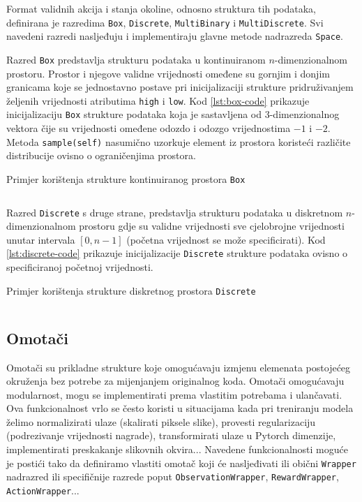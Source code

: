 Format validnih akcija i stanja okoline, odnosno struktura tih podataka, definirana je razredima \texttt{Box}, \texttt{Discrete}, \texttt{MultiBinary} i \texttt{MultiDiscrete}. Svi navedeni razredi nasljeđuju i implementiraju glavne metode nadrazreda \texttt{Space}. 

Razred \texttt{Box} predstavlja strukturu podataka u kontinuiranom $n$-dimenzionalnom prostoru. Prostor i njegove validne vrijednosti omeđene su gornjim i donjim granicama koje se jednostavno postave pri inicijalizaciji strukture pridruživanjem željenih vrijednosti atributima \texttt{high} i \texttt{low}. Kod \ref{lst:box-code} prikazuje inicijalizaciju \texttt{Box} strukture podataka koja je sastavljena od $3$-dimenzionalnog vektora čije su vrijednosti omeđene odozdo i odozgo vrijednostima $-1$ i $-2$. Metoda \texttt{sample(self)} nasumično uzorkuje element iz prostora koristeći različite distribucije ovisno o ograničenjima prostora.

\begin{listing}[H]
    \caption{Primjer korištenja strukture kontinuiranog prostora \texttt{Box}}
    \inputminted{python}{snippets/box.txt}
    \label{lst:box-code}
\end{listing}

Razred \texttt{Discrete} s druge strane, predstavlja strukturu podataka u diskretnom $n$-dimenzionalnom prostoru gdje su validne vrijednosti sve cjelobrojne vrijednosti unutar intervala $[0, n-1]$ (početna vrijednost se može specificirati). Kod \ref{lst:discrete-code} prikazuje inicijalizacije \texttt{Discrete} strukture podataka ovisno o specificiranoj početnoj vrijednosti.

\begin{listing}[H]
    \caption{Primjer korištenja strukture diskretnog prostora \texttt{Discrete}}
    \inputminted{python}{snippets/discrete.txt}
    \label{lst:discrete-code}
\end{listing}

\subsection{Omotači}

Omotači  su prikladne strukture koje omogućavaju izmjenu elemenata postojećeg okruženja bez potrebe za mijenjanjem originalnog koda. Omotači omogućavaju modularnost, mogu se implementirati prema vlastitim potrebama i ulančavati. Ova funkcionalnost vrlo se često koristi u situacijama kada pri treniranju modela želimo normalizirati ulaze (skalirati piksele slike), provesti regularizaciju (podrezivanje vrijednosti nagrade), transformirati ulaze u Pytorch dimenzije, implementirati preskakanje slikovnih okvira...  Navedene funkcionalnosti moguće je postići tako da definiramo vlastiti omotač koji će nasljeđivati ili obični \texttt{Wrapper} nadrazred ili specifičnije razrede poput \texttt{ObservationWrapper}, \texttt{RewardWrapper}, \texttt{ActionWrapper}...

